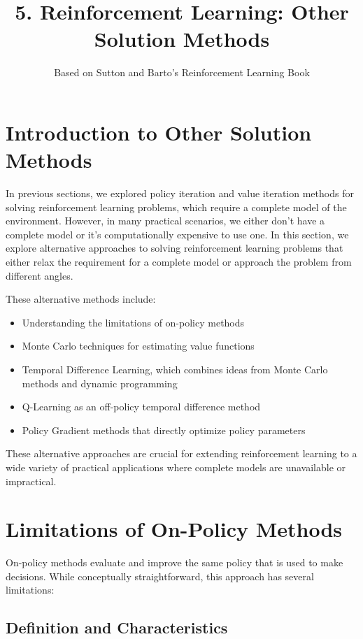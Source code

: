\documentclass[11pt,a4paper]{article}
\title{5. Reinforcement Learning: Other Solution Methods}
\author{Based on Sutton and Barto's Reinforcement Learning Book}
\date{}
\begin{document}
\maketitle
\tableofcontents
\newpage

\section{Introduction to Other Solution Methods}

In previous sections, we explored policy iteration and value iteration methods for solving reinforcement learning problems, which require a complete model of the environment. However, in many practical scenarios, we either don't have a complete model or it's computationally expensive to use one. In this section, we explore alternative approaches to solving reinforcement learning problems that either relax the requirement for a complete model or approach the problem from different angles.

These alternative methods include:
\begin{itemize}
    \item Understanding the limitations of on-policy methods
    \item Monte Carlo techniques for estimating value functions
    \item Temporal Difference Learning, which combines ideas from Monte Carlo methods and dynamic programming
    \item Q-Learning as an off-policy temporal difference method
    \item Policy Gradient methods that directly optimize policy parameters
\end{itemize}

These alternative approaches are crucial for extending reinforcement learning to a wide variety of practical applications where complete models are unavailable or impractical.

\section{Limitations of On-Policy Methods}

On-policy methods evaluate and improve the same policy that is used to make decisions. While conceptually straightforward, this approach has several limitations:

\subsection{Definition and Characteristics}
\end{document}
